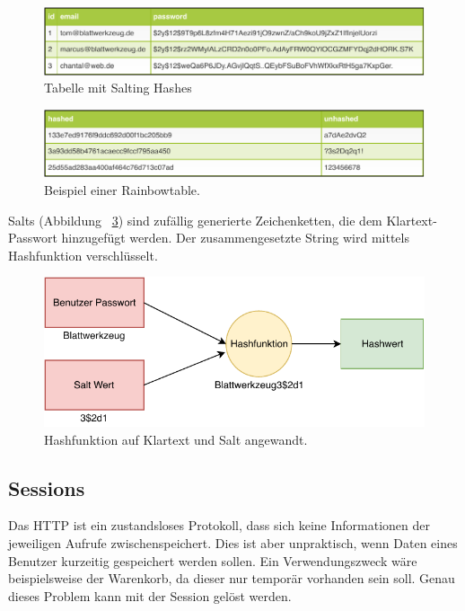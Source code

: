 \begin{figure}
	\includegraphics[width=\textwidth]{graphics/salted_table.pdf}
	\caption{Tabelle mit Salting Hashes}
	\label{fig:salted_table}
\end{figure}

\begin{figure}
	\includegraphics[width=\textwidth]{graphics/rainbowtable.pdf}
	\caption{Beispiel einer Rainbowtable.}
	\label{fig:rainbowtable}
\end{figure}

 Salts (Abbildung ~\ref{fig:salted-hash}) sind zufällig generierte Zeichenketten, die dem Klartext-Passwort hinzugefügt werden. Der zusammengesetzte String wird mittels Hashfunktion verschlüsselt.

\begin{figure}
	\centering
	\includegraphics[width=.89\textwidth]{graphics/salting.pdf}
	\caption{Hashfunktion auf Klartext und Salt angewandt.}
	\label{fig:salted-hash}
\end{figure}

\subsection{Sessions}
\label{sec: sessions}

Das \gls{HTTP} ist ein zustandsloses Protokoll, dass sich keine Informationen der jeweiligen Aufrufe zwischenspeichert. Dies ist aber unpraktisch, wenn Daten eines Benutzer kurzeitig gespeichert werden sollen.  Ein Verwendungszweck wäre beispielsweise der Warenkorb, da dieser nur temporär vorhanden sein soll. Genau dieses Problem kann mit der Session gelöst werden.

